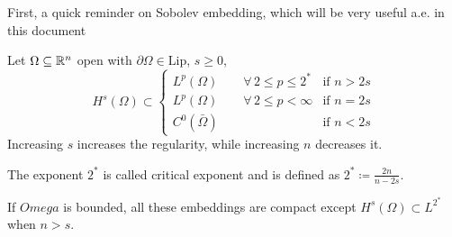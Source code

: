     First, a quick reminder on Sobolev embedding, which will be very useful a.e. in this document
    \begin{remark}
        Let \(\Omega \subseteq \mathbb{R}^n\) open with \(\partial\Omega \in \text{Lip}\), \(s \geq 0\),
        \[
            H^s(\Omega) \subset 
            \begin{cases}
                L^p(\Omega) \qquad \forall \, 2 \leq p \leq 2^* & \text{if } n > 2s \\
                L^p(\Omega) \qquad \forall \, 2 \leq p < \infty & \text{if } n = 2s \\
                C^0(\bar{\Omega})  & \text{if } n < 2s
            \end{cases}
        \]
        Increasing \(s\) increases the regularity, while increasing \(n\) decreases it.
    
        The exponent \(2^*\) is called critical exponent and is defined as \(2^* \coloneqq \frac{2n}{n - 2s}\).
    
        If \(Omega\) is bounded, all these embeddings are compact except \(H^s(\Omega) \subset L^{2^*}\) when \(n > s\).
    \end{remark}
    
